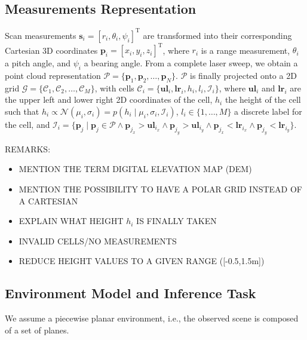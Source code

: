 \subsection{Measurements Representation}
Scan measurements $\mathbf{s}_i=[r_i,\theta_i,\psi_i]^\text{T}$ are transformed
into their corresponding Cartesian 3D coordinates $\mathbf{p}_i=[x_i,y_i,z_i]
^\text{T}$, where $r_i$ is a range measurement, $\theta_i$ a pitch angle, and
$\psi_i$ a bearing angle. From a complete laser sweep, we obtain a point cloud
representation $\mathcal{P}=\{\mathbf{p}_1,\mathbf{p}_2,\dots,\mathbf{p}_N\}$.
$\mathcal{P}$ is finally projected onto a 2D grid $\mathcal{G}=\{\mathcal{C}_1,
\mathcal{C}_2,\dots,\mathcal{C}_M\}$, with cells $\mathcal{C}_i=
\{\mathbf{ul}_i,\mathbf{lr}_i,h_i,l_i,\mathcal{I}_i\}$, where $\mathbf{ul}_i$
and $\mathbf{lr}_i$ are the upper left and lower right 2D coordinates of the
cell, $h_i$ the height of the cell such that $h_i\propto\mathcal{N}(\mu_i,
\sigma_i)=p(h_i\mid\mu_i,\sigma_i,\mathcal{I}_i)$, $l_i\in\{1,\dots,M\}$ a
discrete label for the cell, and $\mathcal{I}_i=\{\mathbf{p}_j\mid\mathbf{p}_j
\in\mathcal{P}\wedge\mathbf{p}_{j_x}>\mathbf{ul}_{i_x}\wedge\mathbf{p}_{j_y}>
\mathbf{ul}_{i_y}\wedge\mathbf{p}_{j_x}<\mathbf{lr}_{i_x}\wedge\mathbf{p}_{j_y}
<\mathbf{lr}_{i_y}\}$.

REMARKS:
\begin{itemize}
\item MENTION THE TERM DIGITAL ELEVATION MAP (DEM)
\item MENTION THE POSSIBILITY TO HAVE A POLAR GRID INSTEAD OF A CARTESIAN
\item EXPLAIN WHAT HEIGHT $h_i$ IS FINALLY TAKEN
\item INVALID CELLS/NO MEASUREMENTS
\item REDUCE HEIGHT VALUES TO A GIVEN RANGE ([-0.5,1.5m])
\end{itemize}

\subsection{Environment Model and Inference Task}
We assume a piecewise planar environment, i.e., the observed scene is composed
of a set of planes.
